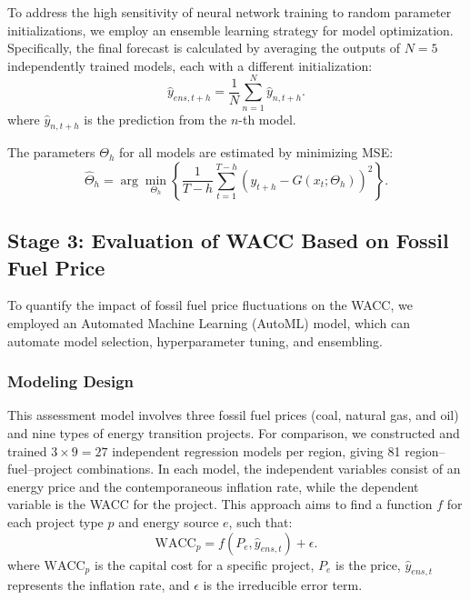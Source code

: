 To address the high sensitivity of neural network training to random parameter initializations, we employ an ensemble learning strategy for model optimization. Specifically, the final forecast is calculated by averaging the outputs of $N=5$ independently trained models, each with a different initialization:
\begin{equation}
\hat{y}_{ens,t+h}=\frac{1}{N}\sum_{n=1}^{N}\hat{y}_{n,t+h}.
\end{equation}
where $\hat{y}_{n,t+h}$ is the prediction from the $n$-th model.

The parameters $\Theta_h$ for all models are estimated by minimizing MSE:
\begin{equation}
\hat{\Theta}_{h}=\arg\min_{\Theta_h}\left\{\frac{1}{T-h}\sum_{t=1}^{T-h}(y_{t+h}-G(x_t;\Theta_h))^2\right\}.
\end{equation}

\subsection{Stage 3: Evaluation of WACC Based on Fossil Fuel Price}

To quantify the impact of fossil fuel price fluctuations on the WACC, we employed an Automated Machine Learning (AutoML) model, which can automate model selection, hyperparameter tuning, and ensembling.

\subsubsection{Modeling Design}
This assessment model involves three fossil fuel prices (coal, natural gas, and oil) and nine types of energy transition projects. For comparison, we constructed and trained $3\times9=27$ independent regression models per region, giving 81 region--fuel--project combinations. In each model, the independent variables consist of an energy price and the contemporaneous inflation rate, while the dependent variable is the WACC for the project. This approach aims to find a function $f$ for each project type $p$ and energy source $e$, such that:
\begin{equation}
    \mathrm{WACC}_{p}=f(P_e,\hat{y}_{ens,t})+\epsilon.
\end{equation}
where $\mathrm{WACC}_{p}$ is the capital cost for a specific project, $P_e$ is the price, $\hat{y}_{ens,t}$ represents the inflation rate, and $\epsilon$ is the irreducible error term.

